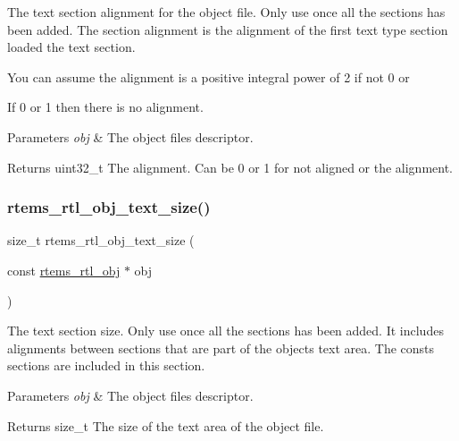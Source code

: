 The text section alignment for the object file. Only use once all the sections has been added. The section alignment is the alignment of the first text type section loaded the text section.

You can assume the alignment is a positive integral power of 2 if not 0 or
\begin{DoxyEnumerate}
\item If 0 or 1 then there is no alignment.
\end{DoxyEnumerate}


\begin{DoxyParams}{Parameters}
{\em obj} & The object file\textquotesingle{}s descriptor. \\
\hline
\end{DoxyParams}
\begin{DoxyReturn}{Returns}
uint32\+\_\+t The alignment. Can be 0 or 1 for not aligned or the alignment. 
\end{DoxyReturn}
\mbox{\label{rtl-obj_8c_a4df3f868b6e5b13ec7e326028683e87a}} 
\subsubsection{\texorpdfstring{rtems\_rtl\_obj\_text\_size()}{rtems\_rtl\_obj\_text\_size()}}
{\footnotesize\ttfamily size\+\_\+t rtems\+\_\+rtl\+\_\+obj\+\_\+text\+\_\+size (\begin{DoxyParamCaption}\item[{const \mbox{\hyperlink{structrtems__rtl__obj}{rtems\+\_\+rtl\+\_\+obj}} $\ast$}]{obj }\end{DoxyParamCaption})}

The text section size. Only use once all the sections has been added. It includes alignments between sections that are part of the object\textquotesingle{}s text area. The consts sections are included in this section.


\begin{DoxyParams}{Parameters}
{\em obj} & The object file\textquotesingle{}s descriptor. \\
\hline
\end{DoxyParams}
\begin{DoxyReturn}{Returns}
size\+\_\+t The size of the text area of the object file. 
\end{DoxyReturn}
\mbox{\label{rtl-obj_8c_a8c0debf8dbf88e9eac3f24357473b1bc}} 
